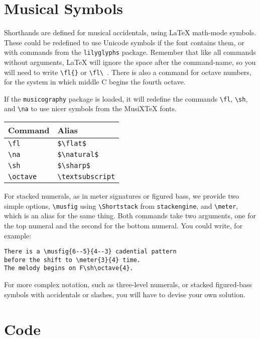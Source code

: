 \documentclass{article}
\begin{document}
\section{Musical Symbols}

Shorthands are defined for musical accidentals, using \LaTeX{} math-mode symbols. 
These could be redefined to use Unicode symbols if the font contains them, or with commands from the \texttt{lilyglyphs} package.
Remember that like all commands without arguments, \LaTeX{} will ignore the space after the command-name, so you will need to write \verb|\fl{}| or \verb|\fl\ |.
There is also a command for octave numbers, for the system in which middle C begins the fourth octave.

If the \texttt{musicography} package is loaded, it will redefine the commands
\verb|\fl|, \verb|\sh|, and \verb|\na| to use nicer symbols from the MusiX\TeX{}
fonts.

\begin{center}
\begin{tabular}{ll}
\toprule
Command & Alias\\
\midrule
\verb|\fl| & \verb|$\flat$|\\
\verb|\na| & \verb|$\natural$|\\
\verb|\sh| & \verb|$\sharp$|\\
\verb|\octave| & \verb|\textsubscript|\\
\bottomrule
\end{tabular}
\end{center}

For stacked numerals, as in meter signatures or figured bass, we provide two
simple options, \verb|\musfig| using \verb|\Shortstack| from
\texttt{stackengine}, and \verb|\meter|, which is an alias for the same thing.
Both commands take two arguments, one for the top numeral and the second for the bottom numeral.
You could write, for example: 

\begin{verbatim}
There is a \musfig{6--5}{4--3} cadential pattern
before the shift to \meter{3}{4} time.
The melody begins on F\sh\octave{4}.
\end{verbatim}

\begin{center}
\end{center}

For more complex notation, such as three-level numerals, or stacked figured-bass symbols with accidentals or slashes, you will have to devise your own solution.

\section{Code}

\end{document}
